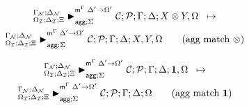 
\begin{multline}
\transx{
   \matstatea{\deltan}{\lstack{C};
      \lstack{P}}{\Gamma}{\Delta}{X \otimes Y, \Omega}{\Delta' \rightarrow
         \Omega'}{\Sigma}
}
{
   \matstatea{\deltan}{\lstack{C};
      \lstack{P}}{\Gamma}{\Delta}{X, Y, \Omega}{\Delta' \rightarrow
         \Omega'}{\Sigma}
} \tag{agg match $\otimes$}
\end{multline}

\begin{multline}
\transx{
   \matstatea{\deltan}{\lstack{C};
      \lstack{P}}{\Gamma}{\Delta}{\one, \Omega}{\Delta' \rightarrow
         \Omega'}{\Sigma}
}
{
   \matstatea{\deltan}{\lstack{C};
      \lstack{P}}{\Gamma}{\Delta}{\Omega}{\Delta' \rightarrow
         \Omega'}{\Sigma}
      } \tag{agg match $\one$}
\end{multline}
